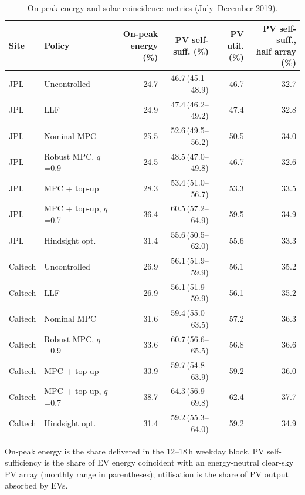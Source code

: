 \begin{table}[H]
\centering
\caption{On-peak energy and solar-coincidence metrics (July--December 2019).}
\label{tab:solar}
\footnotesize
\setlength{\tabcolsep}{1.5pt}
\begin{tabular*}{\textwidth}{@{\extracolsep{\fill}}llrrrr@{}}
\hline
Site & Policy & \makecell[c]{On-peak\\energy (\%)} & \makecell[c]{PV self-\\suff. (\%)} & \makecell[c]{PV util.\\(\%)} & \makecell[c]{PV self-suff.,\\half array (\%)} \\
\hline
JPL & Uncontrolled & 24.7 & 46.7\,{\scriptsize(45.1--48.9)} & 46.7 & 32.7 \\
JPL & LLF & 24.9 & 47.4\,{\scriptsize(46.2--49.2)} & 47.4 & 32.8 \\
JPL & Nominal MPC & 25.5 & 52.6\,{\scriptsize(49.5--56.2)} & 50.5 & 34.0 \\
JPL & Robust MPC, $q$=0.9 & 24.5 & 48.5\,{\scriptsize(47.0--49.8)} & 46.7 & 32.6 \\
JPL & MPC + top-up & 28.3 & 53.4\,{\scriptsize(51.0--56.7)} & 53.3 & 33.5 \\
JPL & MPC + top-up, $q$=0.7 & 36.4 & 60.5\,{\scriptsize(57.2--64.9)} & 59.5 & 34.9 \\
JPL & Hindsight opt. & 31.4 & 55.6\,{\scriptsize(50.5--62.0)} & 55.6 & 33.3 \\
\hline
Caltech & Uncontrolled & 26.9 & 56.1\,{\scriptsize(51.9--59.9)} & 56.1 & 35.2 \\
Caltech & LLF & 26.9 & 56.1\,{\scriptsize(51.9--59.9)} & 56.1 & 35.2 \\
Caltech & Nominal MPC & 31.6 & 59.4\,{\scriptsize(55.0--63.5)} & 57.2 & 36.3 \\
Caltech & Robust MPC, $q$=0.9 & 33.6 & 60.7\,{\scriptsize(56.6--65.5)} & 56.8 & 36.6 \\
Caltech & MPC + top-up & 33.9 & 59.7\,{\scriptsize(54.8--63.9)} & 59.2 & 36.0 \\
Caltech & MPC + top-up, $q$=0.7 & 38.7 & 64.3\,{\scriptsize(56.9--69.8)} & 62.4 & 37.7 \\
Caltech & Hindsight opt. & 31.4 & 59.2\,{\scriptsize(55.3--64.0)} & 59.2 & 34.9 \\
\hline
\end{tabular*}
\par\smallskip\parbox{\textwidth}{\scriptsize On-peak energy is the share delivered in the 12--18\,h weekday block. PV self-sufficiency is the share of EV energy coincident with an energy-neutral clear-sky PV array (monthly range in parentheses); utilisation is the share of PV output absorbed by EVs.}
\end{table}
